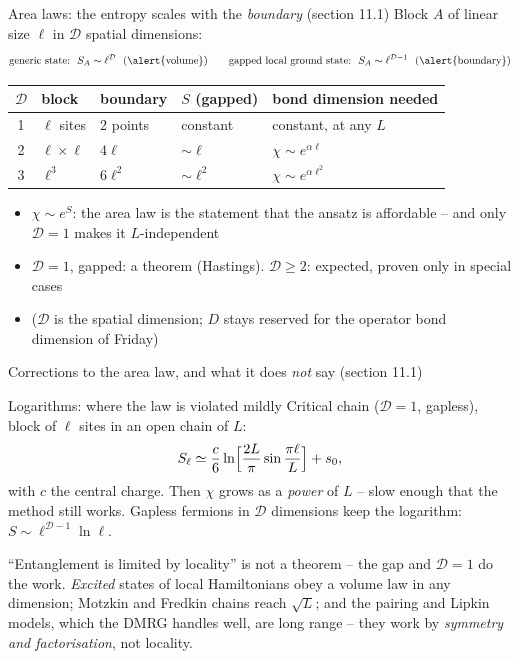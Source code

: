 \documentclass[aspectratio=169,10pt]{beamer}
\newcommand{\warnbox}[1]{%
  \begin{tcolorbox}[colback=palewarm,colframe=warm,title={\bfseries A trap to avoid}]
  #1
  \end{tcolorbox}}
\begin{document}
\begin{frame}{Area laws: the entropy scales with the \emph{boundary} (section 11.1)}
  Block $A$ of linear size $\ell$ in $\mathcal D$ spatial dimensions:
  \[
    \text{generic state:}\ \ S_A\sim\ell^{\mathcal D}\ \ (\text{\alert{volume}})
    \qquad
    \text{gapped local ground state:}\ \ S_A\sim\ell^{\mathcal D-1}\ \ (\text{\alert{boundary}})
  \]
  \begin{center}\small
  \begin{tabular}{@{}cllll@{}}\toprule
  $\mathcal D$ & block & boundary & $S$ (gapped) & bond dimension needed\\\midrule
  1 & $\ell$ sites & 2 points & constant & constant, at any $L$\\
  2 & $\ell\times\ell$ & $4\ell$ & $\sim\ell$ & $\chi\sim e^{\alpha\ell}$\\
  3 & $\ell^3$ & $6\ell^2$ & $\sim\ell^2$ & $\chi\sim e^{\alpha\ell^2}$\\\bottomrule
  \end{tabular}
  \end{center}
  \begin{itemize}
    \item $\chi\sim e^{S}$: the area law \alert{is} the statement that the ansatz is affordable -- and only $\mathcal D=1$ makes it $L$-independent
    \item $\mathcal D=1$, gapped: a theorem (Hastings). $\mathcal D\ge2$: expected, proven only in special cases
    \item ($\mathcal D$ is the spatial dimension; $D$ stays reserved for the operator bond dimension of Friday)
  \end{itemize}
\end{frame}

\begin{frame}{Corrections to the area law, and what it does \emph{not} say (section 11.1)}
  \begin{block}{Logarithms: where the law is violated mildly}
    Critical chain ($\mathcal D=1$, gapless), block of $\ell$ sites in an open chain of $L$:
    \[
      S_\ell\simeq\frac c6\ln\Bigl[\frac{2L}\pi\sin\frac{\pi\ell}L\Bigr]+s_0 ,
    \]
    with $c$ the central charge. Then $\chi$ grows as a \emph{power} of $L$ -- slow enough that the method still works. Gapless fermions in $\mathcal D$ dimensions keep the logarithm: $S\sim\ell^{\mathcal D-1}\ln\ell$.
  \end{block}
  \warnbox{``Entanglement is limited by locality'' is \alert{not} a theorem -- the gap and $\mathcal D=1$ do the work. \emph{Excited} states of local Hamiltonians obey a volume law in any dimension; Motzkin and Fredkin chains reach $\sqrt L$; and the pairing and Lipkin models, which the DMRG handles well, are long range -- they work by \emph{symmetry and factorisation}, not locality.}
\end{frame}
\end{document}
